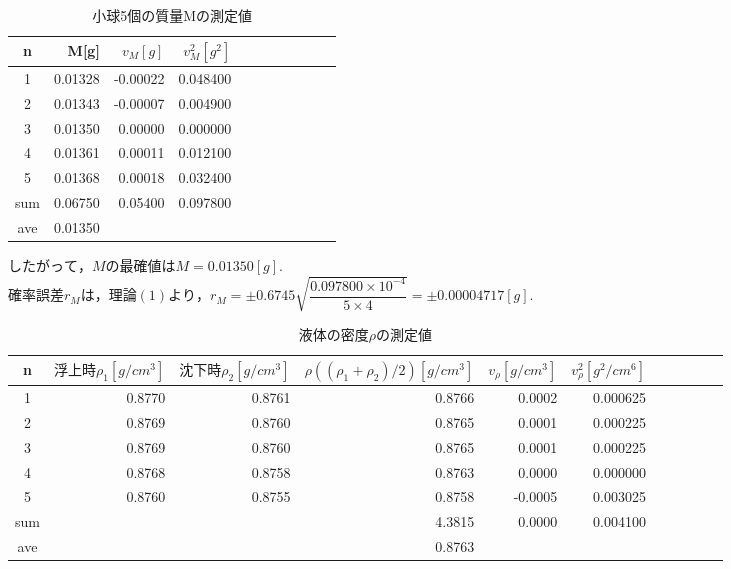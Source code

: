 \documentclass[a4paper,1pt]{jsarticle}
\begin{document}
\begin{table}[H]
  \caption{小球5個の質量Mの測定値}
  \label{table:SpeedOfLight}
  \centering
  \begin{tabular}{|c||r|r|r|r|r|r|r|r|r|r|}
    \hline
    n & M[g] & $v_M[g]$ & $v_M^2[g^2]$ \\

    \hline\hline
    1 & 0.01328 & -0.00022 & 0.048400 \\
    2 & 0.01343 & -0.00007 & 0.004900 \\
    3 & 0.01350 & 0.00000 & 0.000000 \\
    4 & 0.01361 & 0.00011 & 0.012100 \\
    5 & 0.01368 & 0.00018 & 0.032400 \\

    \hline\hline
    sum & 0.06750 & 0.05400 & 0.097800 \\
    \hline
    ave & 0.01350 &  &  \\

    \hline
  \end{tabular}


\end{table}

$したがって，Mの最確値はM=0.01350[g].$\\

$確率誤差r_Mは，理論(1)より，r_M=\pm0.6745\sqrt{\dfrac{0.097800\times10^{-4}}{5\times4}}=\pm0.00004717[g].$


\begin{table}[H]
  \caption{液体の密度$\rho $の測定値}
  \label{table:SpeedOfLight}
  \centering
  \begin{tabular}{|c||r|r|r|r|r|r|r|r|r|r|}
    \hline
    n & $浮上時\rho _1[g/cm^3]$ & $沈下時\rho _2[g/cm^3]$ & $\rho((\rho _1+\rho _2)/2) [g/cm^3]$ & $v_\rho [g/cm^3]$ & $v_\rho ^2[g^2/cm^6]$ \\

    \hline\hline
    1 & 0.8770 & 0.8761 & 0.8766 & 0.0002 & 0.000625 \\
    2 & 0.8769 & 0.8760 & 0.8765 & 0.0001 & 0.000225 \\
    3 & 0.8769 & 0.8760 & 0.8765 & 0.0001 & 0.000225 \\
    4 & 0.8768 & 0.8758 & 0.8763 & 0.0000 & 0.000000 \\
    5 & 0.8760 & 0.8755 & 0.8758 & -0.0005 & 0.003025 \\


    \hline\hline
    sum & & & 4.3815 & 0.0000 & 0.004100 \\

    \hline
    ave & & & 0.8763 &  &  \\

    \hline
  \end{tabular}


\end{table}
\end{document}
